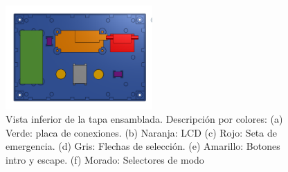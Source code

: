 \begin{figure}[h]%
    \centering 
        \includegraphics[width=0.5\textwidth]{04-caja/ensamblajetapainferior.png}
    \caption{Vista inferior de la tapa ensamblada. Descripción por colores: (a) Verde: placa de 
    conexiones. (b) Naranja: LCD (c) Rojo: Seta de emergencia. (d) Gris: Flechas de selección.
    (e) Amarillo: Botones intro y escape. (f) Morado: Selectores de modo}
    \label{fig:cajatapaensamblaje} 
\end{figure}